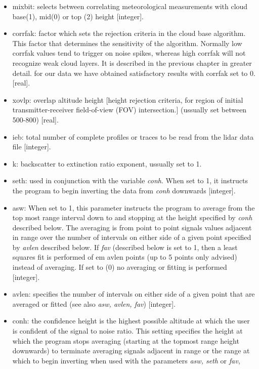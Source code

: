 \begin{itemize}
(1) or the linear value (0) in the cloud base algorithm. For I.R. data
set to 1 [integer].
\item mixbit: selects between correlating meteorological measurements
with cloud base(1), mid(0) or top (2) height [integer].
\item corrfak: factor which sets the rejection criteria in the cloud
base algorithm. This factor that determines the sensitivity of 
the algorithm. Normally low corrfak values tend to trigger on
noise spikes, whereas high corrfak will not recognize weak cloud layers. 
It is described in the previous chapter in greater detail. 
for our data we have obtained satisfactory results with corrfak set 
to 0. [real].
\item xovlp: overlap altitude height [height rejection criteria, for
region of initial transmitter-receiver field-of-view (FOV)
intersection.] (ussually set between 500-800) [real].
\item ieb: total number of complete profiles or traces to be read from the
lidar data file [integer].
\item k: backscatter to extinction ratio exponent, ussually set to 1.
\item seth: used in conjunction with the variable {\em conh}. When set to 1,
it instructs the program to begin inverting the data from {\em conh}
downwards [integer].
\item asw: When set to 1, this parameter instructs the program to 
average from the top most range interval down to and stopping at 
the height specified by {\em conh} described below. The averaging
is from point to point signals values adjacent in range 
over the number of intervals on either side of a given point
specified by {\em avlen} described below. If {\em fav} (described
below is set to 1, then a least squares fit is performed of
{em avlen} points (up to 5 points only advised) instead of averaging.
If set to (0) no averaging or fitting is performed [integer].
\item avlen: specifies the number of intervals on either side of a given
point that are averaged or fitted (see also {\em asw, avlen, fav}) [integer].
\item conh: the confidence height is the highest possible altitude at which the
user is confident of the signal to noise ratio. This setting 
specifies the height at which the program stops averaging
(starting at the topmost range height downwards) to terminate 
averaging signals adjacent in range or the range at which to begin
inverting when used with the parameters {\em asw, seth} or {\em fav}, 

\end{itemize}
